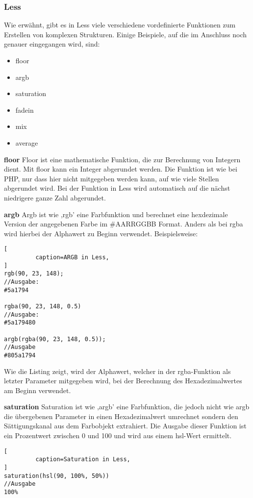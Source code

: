 \subsubsection{Less}
Wie erwähnt, gibt es in Less viele verschiedene vordefinierte Funktionen zum Erstellen von komplexen Strukturen. Einige Beispiele, auf die im Anschluss noch genauer eingegangen wird, sind:
\begin{itemize}
  \item{floor}
  \item{argb}
  \item{saturation}
  \item{fadein}
  \item{mix}
  \item{average}
\end{itemize}
\textbf{floor}\newline
Floor ist eine mathematische Funktion, die zur Berechnung von Integern dient. Mit floor kann ein Integer abgerundet werden. Die Funktion ist wie bei PHP, nur dass hier nicht mitgegeben werden kann, auf wie viele Stellen abgerundet wird. Bei der Funktion in Less wird automatisch auf die nächst niedrigere ganze Zahl abgerundet.

\textbf{argb}\newline
Argb ist wie ,rgb' eine Farbfunktion und berechnet eine hexdezimale  Version der angegebenen Farbe im \#AARRGGBB Format. Anders als bei rgba wird hierbei der Alphawert zu Beginn verwendet. Beispielsweise:
\begin{lstlisting}[
         caption=ARGB in Less,
]
rgb(90, 23, 148);
//Ausgabe:
#5a1794

rgba(90, 23, 148, 0.5)
//Ausgabe:
#5a179480

argb(rgba(90, 23, 148, 0.5));
//Ausgabe
#805a1794
\end{lstlisting}
Wie die Listing zeigt, wird der Alphawert, welcher in der rgba-Funktion als letzter Parameter mitgegeben wird, bei der Berechnung des Hexadezimalwertes am Beginn verwendet. 

\textbf{saturation}\newline
Saturation ist wie ,argb' eine Farbfunktion, die jedoch nicht wie argb die übergebenen Parameter in einen Hexadezimalwert umrechnet sondern den Sättigungskanal aus dem Farbobjekt extrahiert. Die Ausgabe dieser Funktion ist ein Prozentwert zwischen 0 und 100 und wird aus einem hsl-Wert ermittelt.
\begin{lstlisting}[
         caption=Saturation in Less,
]
saturation(hsl(90, 100%, 50%))
//Ausgabe
100%
\end{lstlisting}

